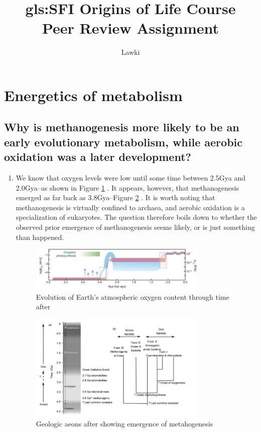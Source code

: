 \documentclass[]{article}
\title{
	\gls{gls:SFI} Origins of Life Course\\
	Peer Review Assignment}
\author{Lawki}
\begin{document}
\maketitle

\tableofcontents

\section{Energetics of metabolism}

\subsection{
	Why is methanogenesis more likely to be an early evolutionary metabolism, while aerobic oxidation was a later development?
}

\begin{enumerate}
	\item We know that oxygen levels were low until some time between 2.5Gya and 2.0Gya--as shown in Figure \ref{fig:nature13068-f1} \cite{lyons2014rise}.  It appears, however, that methanogenesis emerged as far back as 3.8Gya--Figure \ref{fig:nisbet2011evolution} \cite{nisbet2011evolution}. It is worth noting that methanogenesis is virtually confined to archaea\cite{angel2012methanogenic}, and aerobic oxidation is a specialization of eukaryotes. The question therefore boils down to whether the observed prior emergence of methanogenesis seems likely, or is just something than happened.
	\begin{figure}[H]
		\caption{Evolution of Earth’s atmospheric oxygen content through time after \cite{lyons2014rise} }\label{fig:nature13068-f1}
		\includegraphics[width=0.8\textwidth]{nature13068-f1}
	\end{figure}
	
	\begin{figure}[H]
		\caption{Geologic aeons after \cite{nisbet2011evolution} showing emergence of metahogenesis}\label{fig:nisbet2011evolution}
		\includegraphics[width=0.8\textwidth]{nisbet2011evolution}
	\end{figure}
	

\end{enumerate}
\end{document}
